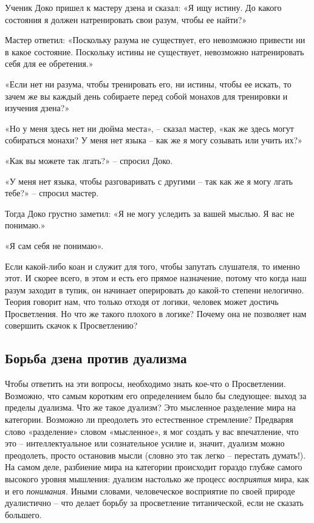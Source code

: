 \documentclass[../main.tex]{subfiles}
\begin{document}
\begin{koan}
    Ученик Доко пришел к мастеру дзена и сказал: «Я ищу истину. До какого состояния я должен натренировать свои разум, чтобы ее найти?»

    Мастер ответил: «Поскольку разума не существует, его невозможно привести ни в какое состояние. Поскольку истины не существует, невозможно натренировать себя для ее обретения.»

    «Если нет ни разума, чтобы тренировать его, ни истины, чтобы ее искать, то зачем же вы каждый день собираете перед собой монахов для тренировки и изучения дзена?»

    «Но у меня здесь нет ни дюйма места», \--- сказал мастер, «как же здесь могут собираться монахи? У меня нет языка \--- как же я могу созывать или учить их?»

    «Как вы можете так лгать?» \--- спросил Доко.

    «У меня нет языка, чтобы разговаривать с другими \--- так как же я могу лгать тебе?» \--- спросил мастер.

    Тогда Доко грустно заметил: «Я не могу уследить за вашей мыслью. Я вас не понимаю.»

    «Я сам себя не понимаю».
\end{koan}

Если какой-либо коан и служит для того, чтобы запутать слушателя, то именно этот. И скорее всего, в этом и есть его прямое назначение, потому что когда наш разум заходит в тупик, он начинает оперировать до какой-то степени нелогично. Теория говорит нам, что только отходя от логики, человек может достичь Просветления. Но что же такого плохого в логике? Почему она не позволяет нам совершить скачок к Просветлению?


\subsection{Борьба дзена против дуализма}

Чтобы ответить на эти вопросы, необходимо знать кое-что о Просветлении. Возможно, что самым коротким его определением было бы следующее: выход за пределы дуализма. Что же такое дуализм? Это мысленное разделение мира на категории. Возможно ли преодолеть это естественное стремление? Предваряя слово «разделение» словом «мысленное», я мог создать у вас впечатление, что это \--- интеллектуальное или сознательное усилие и, значит, дуализм можно преодолеть, просто остановив мысли (словно это так легко \--- перестать думать!). На самом деле, разбиение мира на категории происходит гораздо глубже самого высокого уровня мышления: дуализм настолько же процесс \emph{восприятия} мира, как и его \emph{понимания.} Иными словами, человеческое восприятие по своей природе дуалистично \--- что делает борьбу за просветление титанической, если не сказать большего.
\end{document}
